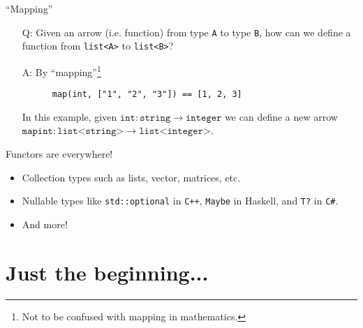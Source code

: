 \documentclass[10pt]{beamer}
\begin{document}
\begin{frame}[fragile]{``Mapping''}
  \begin{enumerate}
  \item[Q:] Given an arrow (i.e. function) from type \texttt{A} to type \texttt{B}, how can we define a function from \texttt{list<A>} to \texttt{list<B>}?
  \item[A:] By ``mapping''\footnote{Not to be confused with mapping in mathematics.}

    \begin{lstlisting}
      map(int, ["1", "2", "3"]) == [1, 2, 3]
    \end{lstlisting}
  In this example, given \(\texttt{int} : \texttt{string} \to \texttt{integer}\) we can define a new arrow \(\texttt{mapint} : \texttt{list<string>} \to \texttt{list<integer>}\).
  \end{enumerate}
\end{frame}

\begin{frame}{Functors are everywhere!}
  \begin{itemize}
  \item Collection types such as lists, vector, matrices, etc.
  \item Nullable types like \texttt{std::optional} in \texttt{C++}, \texttt{Maybe} in Haskell, and \texttt{T?} in \texttt{C\#}.
  \item And more!
  \end{itemize}
\end{frame}

\section{Just the beginning...}
\end{document}
